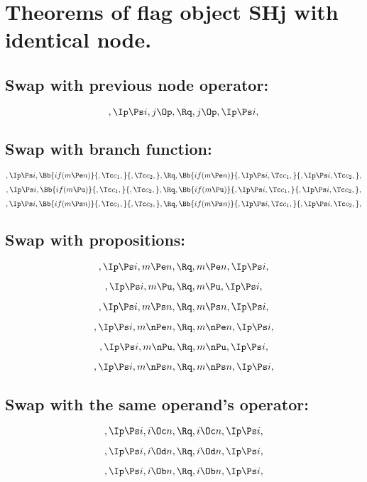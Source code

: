 \bigskip
\bigskip
\bigskip
\bigskip
\section{Theorems of flag object SHj with identical node.}
\subsection{Swap with previous node operator:}
\[,\Ip \Ps i, j \Op, \Rq ,j \Op, \Ip \Ps i,\]

\bigskip
\bigskip
\subsection{Swap with branch function:}
\[,\Ip \Ps i, \Bb{if(m \Pe n)}{,\Tc c_1,}{,\Tc c_2,}, \Rq , \Bb{if(m \Pe n)}{,\Ip \Ps i, \Tc c_1,}{,\Ip \Ps i, \Tc c_2,},\]
\bigskip
\bigskip
\[,\Ip \Ps i, \Bb{if(m \Pu)}{,\Tc c_1,}{,\Tc c_2,}, \Rq , \Bb{if(m \Pu)}{,\Ip \Ps i, \Tc c_1,}{,\Ip \Ps i, \Tc c_2,},\]
\bigskip
\bigskip
\[,\Ip \Ps i, \Bb{if(m \Ps n)}{,\Tc c_1,}{,\Tc c_2,}, \Rq , \Bb{if(m \Ps n)}{,\Ip \Ps i, \Tc c_1,}{,\Ip \Ps i, \Tc c_2,},\]


\bigskip
\bigskip
\subsection{Swap with propositions:}
\[,\Ip \Ps i, m \Pe n, \Rq , m \Pe n, \Ip \Ps i,\]

\[,\Ip \Ps i, m \Pu, \Rq , m \Pu, \Ip \Ps i,\]

\[,\Ip \Ps i, m \Ps n, \Rq , m \Ps n, \Ip \Ps i,\]

\[,\Ip \Ps i, m \nPe n, \Rq , m \nPe n, \Ip \Ps i,\]

\[,\Ip \Ps i, m \nPu, \Rq , m \nPu, \Ip \Ps i,\]

\[,\Ip \Ps i, m \nPs n, \Rq , m \nPs n, \Ip \Ps i,\]


\bigskip
\bigskip
\subsection{Swap with the same operand's operator:}
\[,\Ip \Ps i, i \Oc n, \Rq , i \Oc n, \Ip \Ps i,\]

\[,\Ip \Ps i, i \Od n, \Rq , i \Od n, \Ip \Ps i,\]

\[,\Ip \Ps i, i \Ob n, \Rq , i \Ob n, \Ip \Ps i,\]


\bigskip
\bigskip

